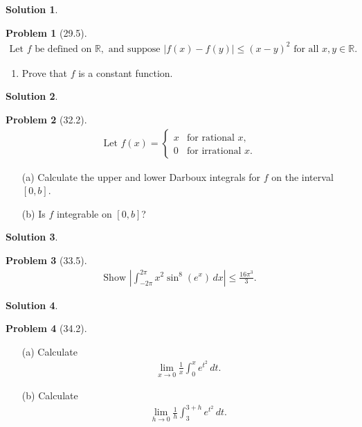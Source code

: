 \documentclass[12pt]{article}
\theoremstyle{definition} %
\newtheorem{solution}{Solution}
\newtheorem{problem}{Problem}
\theoremstyle{plain} %
\begin{document}
\begin{solution}
    
\end{solution}
\begin{problem}[29.5]
    \begin{align}
        \text{Let } f \text{ be defined on } \mathbb{R}, \text{ and suppose } |f(x) - f(y)| \leq (x - y)^2 \text{ for all } x, y \in \mathbb{R}.
    \end{align}
    \begin{enumerate}
        \item Prove that \( f \) is a constant function.
    \end{enumerate}
\end{problem}
\begin{solution}
    
\end{solution}
\begin{problem}[32.2]
    \begin{align}
        \text{Let } f(x) = 
        \begin{cases} 
            x & \text{for rational } x, \\
            0 & \text{for irrational } x.
        \end{cases}
    \end{align}
    \begin{enumerate}
        \item[(a)] Calculate the upper and lower Darboux integrals for \( f \) on the interval \([0, b]\).
        \item[(b)] Is \( f \) integrable on \([0, b]\)?
    \end{enumerate}
\end{problem}
\begin{solution}
    
\end{solution}
\begin{problem}[33.5]
    \begin{align}
        \text{Show } \left| \int_{-2\pi}^{2\pi} x^2 \sin^8(e^x) \, dx \right| \leq \frac{16\pi^3}{3}.
    \end{align}
\end{problem}
\begin{solution}
    
\end{solution}
\begin{problem}[34.2]
    \begin{enumerate}
        \item[(a)] Calculate 
        \begin{align}
            \lim_{x \to 0} \frac{1}{x} \int_{0}^{x} e^{t^2} \, dt.
        \end{align}
        \item[(b)] Calculate 
        \begin{align}
            \lim_{h \to 0} \frac{1}{h} \int_{3}^{3+h} e^{t^2} \, dt.
        \end{align}
    \end{enumerate}
\end{problem}
\end{document}
